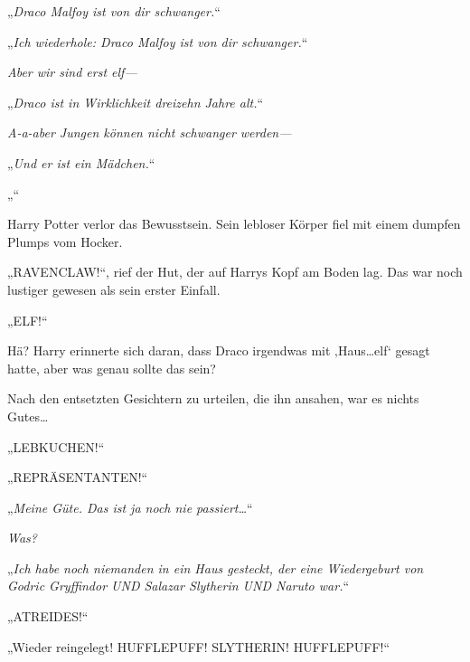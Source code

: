 \emph{}

„\emph{Draco Malfoy ist von dir schwanger.}“

\emph{}

„\emph{Ich wiederhole: Draco Malfoy ist von dir schwanger.}“

\emph{Aber wir sind erst elf—}

„\emph{Draco ist in Wirklichkeit dreizehn Jahre alt.}“

\emph{A-a-aber Jungen können nicht schwanger werden—}

„\emph{Und er ist ein Mädchen.}“

\emph{}

„\emph{}“

Harry Potter verlor das Bewusstsein. Sein lebloser Körper fiel mit einem dumpfen Plumps vom Hocker.

„\uppercase{Ravenclaw}!“, rief der Hut, der auf Harrys Kopf am Boden lag. Das war noch lustiger gewesen als sein erster Einfall.

\later

„ELF!“

Hä? Harry erinnerte sich daran, dass Draco irgendwas mit ‚Haus…elf‘ gesagt hatte, aber was genau sollte das sein?

Nach den entsetzten Gesichtern zu urteilen, die ihn ansahen, war es nichts Gutes…

\later

„\uppercase{Lebkuchen}!“%

\later

„\uppercase{Repräsentanten}!“

\later

„\emph{Meine Güte. Das ist ja noch nie passiert…}“

\emph{Was?}

„\emph{Ich habe noch niemanden in ein Haus gesteckt, der eine Wiedergeburt von Godric Gryffindor UND Salazar Slytherin UND Naruto war.}“

\later

„\uppercase{Atreides}!“%

\later

„Wieder reingelegt! \uppercase{Hufflepuff! Slytherin! Hufflepuff!}“

